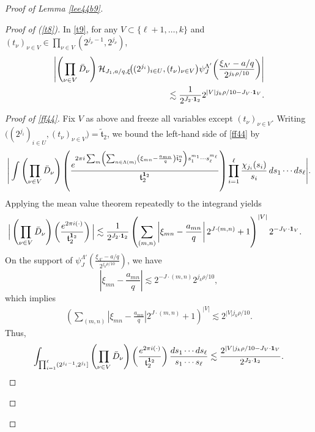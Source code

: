\documentclass[10pt,a4paper]{amsart}
\numberwithin{equation}{section}
\begin{document}
\begin{proof}[Proof of Lemma \ref{lee44b9}]
\begin{proof}[Proof of (\ref{t8})]
In \eqref{t9}, for any  $V\subset \{\ell+1,\dots,k\}$ and
$(t_{\nu})_{\nu\in V}\in \prod_{\nu\in V}(2^{j_\nu-1},2^{j_\nu})$,  
\begin{align}
\left|
\left(\prod_{\nu\in V}\bar{D}_\nu\right)
\mathcal{H}_{J_1,a/q,\xi}\!\big((2^{j_i})_{i\in U},(t_\nu)_{\nu\in V}\big)
\psi_J^{\Lambda'}\!\left(\frac{\xi_{\Lambda'}-a/q}{2^{j_k\rho/10}}\right)
\right|\label{ff44} \\
\lesssim \frac{1}{2^{J_2\cdot {\bf 1}_2}}
2^{|V| j_k\rho/10 - J_V\cdot {\bf 1}_V}. \nonumber
\end{align}

\begin{proof}[Proof of \eqref{ff44}]
Fix $V$ as above and freeze all variables except $(t_\nu)_{\nu\in V}$. Writing $\big((2^{j_i})_{i\in U},(t_\nu)_{\nu\in V}\big)=\tilde{\mathfrak{t}}_2$,
we bound the left-hand side of \eqref{ff44} by
\begin{align*}
\Bigg|
\int \left(\prod_{\nu\in V}\bar{D}_\nu\right)
\left(
\frac{
e^{2\pi i \sum_{m}\left(\sum_{n\in \Lambda(m)}
\left(\xi_{mn}-\frac{a_{mn}}{q}\right)\tilde{\mathfrak{t}}_2^n\right)
s_1^{m_1}\cdots s_\ell^{m_\ell}}
}{
\mathfrak{t}_2^{{\bf 1}_2}
}
\right)
\prod_{i=1}^\ell \frac{\chi_{j_i}(s_i)}{s_i}
\, ds_1\cdots ds_\ell
\Bigg|.
\end{align*}
Applying the mean value theorem repeatedly to the integrand yields
\begin{align*}
\Big| \left(\prod_{\nu\in V}\bar{D}_\nu\right)\left(\frac{e^{2\pi i (\cdot)} }{\mathfrak{t}_2^{{\bf 1}_2}}\right)\Big|
  &\lesssim
\frac{1}{2^{J_2\cdot {\bf 1}_2}}
\left(
\sum_{(m,n)}
\left|\xi_{mn}-\frac{a_{mn}}{q}\right|
2^{J\cdot(m,n)} + 1
\right)^{|V|}
2^{-J_V\cdot {\bf 1}_V}.
\end{align*}
On the support of
$\psi_J^{\Lambda'}\!\left(\frac{\xi_{\Lambda'}-a/q}{2^{j_k\rho/10}}\right)$,
we have
\[
\left|\xi_{mn}-\frac{a_{mn}}{q}\right|
\lesssim 2^{-J\cdot(m,n)} 2^{j_k\rho/10},
\]
which implies
\begin{align*}
\left(
\sum_{(m,n)}
\left|\xi_{mn}-\frac{a_{mn}}{q}\right|
2^{J\cdot(m,n)} + 1
\right)^{|V|}
\lesssim 2^{|V| j_k\rho/10}.
\end{align*}
Thus,
\[ \int_{\prod_{i=1}^{\ell} (2^{j_i-1} ,2^{j_{i}}] } \left(\prod_{\nu\in V}\bar{D}_\nu\right)
\left(\frac{e^{2\pi i (\cdot)} }{\mathfrak{t}_2^{{\bf 1}_2}}\right)
 \frac{ds_1\cdots ds_{\ell} }{s_1\cdots s_\ell}
\lesssim
\frac{2^{|V| j_k\rho/10 - J_V\cdot {\bf 1}_V}}{2^{J_2\cdot {\bf 1}_2}}.
\]
\end{proof}


\end{proof}
\end{proof}
\end{document}

